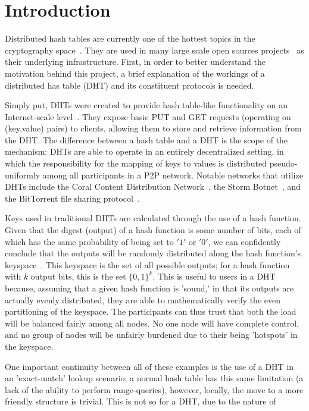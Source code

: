 \documentclass[12pt]{article}
\begin{document}
\section{Introduction}
\par Distributed hash tables are currently one of the hottest topics in the cryptography space~\cite{Stoica:2001dj,Rowstron:2001ea,Ratnasamy:2001wn}. They are used in many large scale open sources projects~\cite{Freitas:2013tb,Xu:2010vs,Perfitt:2010fh} as their underlying infrastructure. First, in order to better understand the motivation behind this project, a brief explanation of the workings of a distributed has table (DHT) and its constituent protocols is needed.

\par Simply put, DHTs were created to provide hash table-like functionality on an Internet-scale level~\cite{Ratnasamy:2001wn}. They expose basic PUT and GET requests (operating on (key,value) pairs) to clients, allowing them to store and retrieve information from the DHT. The difference between a hash table and a DHT is the scope of the mechanism: DHTs are able to operate in an entirely decentralized setting, in which the responsibility for the mapping of keys to values is distributed pseudo-uniformly among all participants in a P2P network. Notable networks that utilize DHTs include the Coral Content Distribution Network~\cite{Freedman:2004vb}, the Storm Botnet~\cite{Holz:2008uk}, and the BitTorrent file sharing protocol~\cite{Cohen:y1_8mBnw}.

\par Keys used in traditional DHTs are calculated through the use of a hash function. Given that the digest (output) of a hash function is some number of bits, each of which has the same probability of being set to $'1'$ or $'0'$, we can confidently conclude that the outputs will be randomly distributed along the hash function's keyspace~. This keyspace is the set of all possible outputs; for a hash function with $k$ output bits, this is the set $\{0,1\}^k$. This is useful to users in a DHT because, assuming that a given hash function is 'sound,' in that its outputs are actually evenly distributed, they are able to mathematically verify the even partitioning of the keyspace. The participants can thus trust that both the load will be balanced fairly among all nodes. No one node will have complete control, and no group of nodes will be unfairly burdened due to their being 'hotspots' in the keyspace.~

\par One important continuity between all of these examples is the use of a DHT in an 'exact-match' lookup scenario; a normal hash table has this same limitation (a lack of the ability to perform range-queries), however, locally, the move to a more friendly structure is trivial. This is not so for a DHT, due to the nature of
\printbibliography
\end{document}
